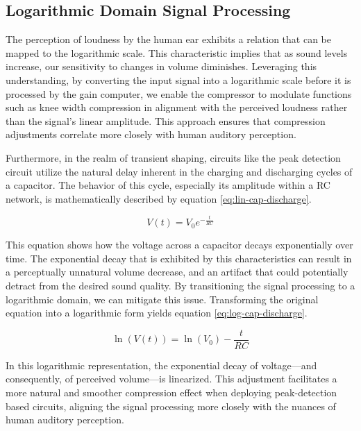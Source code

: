 \documentclass[10pt]{article}
\begin{document}
\begin{multicols*}{2}
            \subsection{Logarithmic Domain Signal Processing}
                The perception of loudness by the human ear exhibits a relation that can be mapped to the logarithmic scale. This characteristic implies that as sound levels increase, our sensitivity to changes in volume diminishes. Leveraging this understanding, by converting the input signal into a logarithmic scale before it is processed by the gain computer, we enable the compressor to modulate functions such as knee width compression in alignment with the perceived loudness rather than the signal's linear amplitude. This approach ensures that compression adjustments correlate more closely with human auditory perception.\par
                Furthermore, in the realm of transient shaping, circuits like the peak detection circuit utilize the natural delay inherent in the charging and discharging cycles of a capacitor. The behavior of this cycle, especially its amplitude within a RC network, is mathematically described by equation \ref{eq:lin-cap-discharge}.
                
                    \begin{equation}\label{eq:lin-cap-discharge}
                        V(t) = V_0 e^{-\frac{t}{RC}}
                    \end{equation}    
                
                \noindent This equation shows how the voltage across a capacitor decays exponentially over time. The exponential decay that is exhibited by this characteristics can result in a perceptually unnatural volume decrease, and an artifact that could potentially detract from the desired sound quality. By transitioning the signal processing to a logarithmic domain, we can mitigate this issue. Transforming the original equation into a logarithmic form yields equation \ref{eq:log-cap-discharge}.
                
                    \begin{equation}\label{eq:log-cap-discharge}
                        \ln(V(t)) = \ln(V_0) - \frac{t}{RC}
                    \end{equation}
                
                \noindent In this logarithmic representation, the exponential decay of voltage—and consequently, of perceived volume—is linearized. This adjustment facilitates a more natural and smoother compression effect when deploying peak-detection based circuits, aligning the signal processing more closely with the nuances of human auditory perception. 
                

\end{multicols*}
\end{document}
